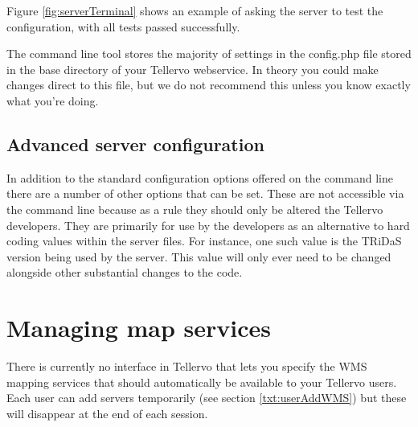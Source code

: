Figure \ref{fig:serverTerminal} shows an example of asking the server to test the configuration, with all tests passed successfully.

The command line tool stores the majority of settings in the config.php file stored in the base directory of your Tellervo webservice.  In theory you could make changes direct to this file, but we do not recommend this unless you know exactly what you're doing.


\subsection{Advanced server configuration}

In addition to the standard configuration options offered on the command line there are a number of other options that can be set.  These are not accessible via the command line because as a rule they should only be altered the Tellervo developers.  They are primarily for use by the developers as an alternative to hard coding values within the server files.  For instance, one such value is the TRiDaS version being used by the server.  This value will only ever need to be changed alongside other substantial changes to the code.  




\section{Managing map services}
\label{txt:managingmaps}

There is currently no interface in Tellervo that lets you specify the WMS mapping services that should automatically be available to your Tellervo users.  Each user can add servers temporarily (see section \ref{txt:userAddWMS}) but these will disappear at the end of each session.  
